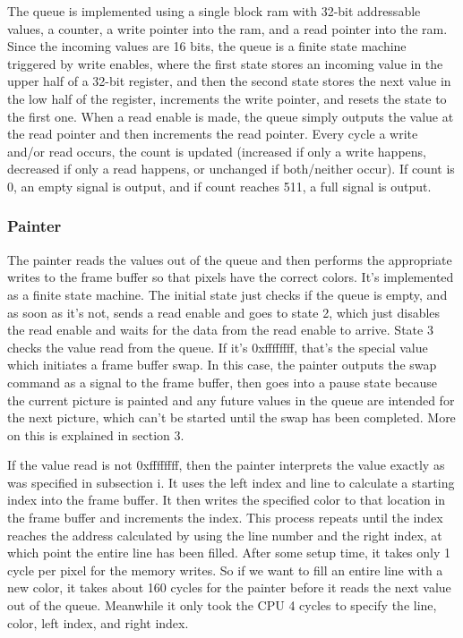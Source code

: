 \documentclass[onecolumn]{IEEEtran}
\begin{document}
The queue is implemented using a single block ram with 32-bit addressable values, a counter, a write pointer into the ram, and a read pointer into the ram.  Since the incoming values are 16 bits, the queue is a finite state machine triggered by write enables, where the first state stores an incoming value in the upper half of a 32-bit register, and then the second state stores the next value in the low half of the register, increments the write pointer, and resets the state to the first one.  When a read enable is made, the queue simply outputs the value at the read pointer and then increments the read pointer.  Every cycle a write and/or read occurs, the count is updated (increased if only a write happens, decreased if only a read happens, or unchanged if both/neither occur).  If count is 0, an empty signal is output, and if count reaches 511, a full signal is output.

\subsubsection{Painter}
The painter reads the values out of the queue and then performs the appropriate writes to the frame buffer so that pixels have the correct colors.  It’s implemented as a finite state machine.  The initial state just checks if the queue is empty, and as soon as it’s not, sends a read enable and goes to state 2, which just disables the read enable and waits for the data from the read enable to arrive.  State 3 checks the value read from the queue.  If it’s 0xffffffff, that’s the special value which initiates a frame buffer swap.  In this case, the painter outputs the swap command as a signal to the frame buffer, then goes into a pause state because the current picture is painted and any future values in the queue are intended for the next picture, which can’t be started until the swap has been completed.  More on this is explained in section 3.

If the value read is not 0xffffffff, then the painter interprets the value exactly as was specified in subsection i.  It uses the left index and line to calculate a starting index into the frame buffer.  It then writes the specified color to that location in the frame buffer and increments the index.  This process repeats until the index reaches the address calculated by using the line number and the right index, at which point the entire line has been filled.  After some setup time, it takes only 1 cycle per pixel for the memory writes.  So if we want to fill an entire line with a new color, it takes about 160 cycles for the painter before it reads the next value out of the queue.  Meanwhile it only took the CPU 4 cycles to specify the line, color, left index, and right index.
\end{document}
